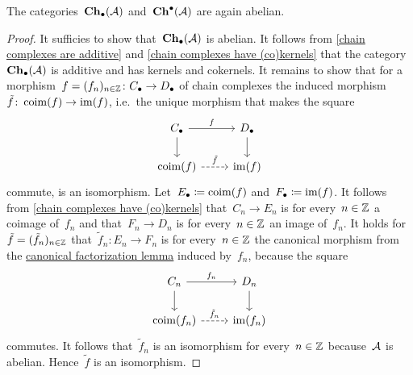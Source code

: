 

\begin{theorem}
  The categories~$\mathbf{Ch}_\bullet(\mathcal{A})$ and~$\mathbf{Ch}^\bullet(\mathcal{A})$ are again abelian.
\end{theorem}


\begin{proof}
  It sufficies to show that~$\mathbf{Ch}_\bullet(\mathcal{A})$ is abelian.
  It follows from \cref{chain complexes are additive} and \cref{chain complexes have (co)kernels} that the category~$\mathbf{Ch}_\bullet(\mathcal{A})$ is additive and has kernels and cokernels.
  It remains to show that for a morphism~$f = (f_n)_{n \in \mathbb{Z}} \colon C_\bullet \to D_\bullet$ of chain complexes the induced morphism~$\tilde{f} \colon \operatorname{coim}(f) \to \operatorname{im}(f)$, i.e.\ the unique morphism that makes the square
  \[
    \begin{tikzcd}
        \Ccc
        \arrow{r}[above]{f}
        \arrow{d}
      & \Dcc
        \arrow{d}
      \\
        \coim(f)
        \arrow[dashed]{r}[above]{\tilde{f}}
      & \im(f)
    \end{tikzcd}
  \]
  commute, is an isomorphism.
  Let~$E_\bullet \coloneqq \operatorname{coim}(f)$ and~$F_\bullet \coloneqq \operatorname{im}(f)$.
  It follows from \cref{chain complexes have (co)kernels} that~$C_n \to E_n$ is for every~$n \in \mathbb{Z}$ a coimage of~$f_n$ and that~$F_n \to D_n$ is for every~$n \in \mathbb{Z}$ an image of~$f_n$.
  It holds for~$\tilde{f} = (\tilde{f}_n)_{n \in \mathbb{Z}}$ that~$\tilde{f}_n \colon E_n \to F_n$ is for every~$n \in \mathbb{Z}$ the canonical morphism from the \hyperref[canonical factorization]{canonical factorization lemma} induced by~$f_n$, because the square
  \[
    \begin{tikzcd}
        C_n
        \arrow{r}[above]{f_n}
        \arrow{d}
      & D_n
        \arrow{d}
      \\
        \coim(f_n)
        \arrow[dashed]{r}[above]{\tilde{f}_n}
      & \im(f_n)
    \end{tikzcd}
  \]
  commutes.
  It follows that~$\tilde{f}_n$ is an isomorphism for every~$n \in \mathbb{Z}$ because~$\mathcal{A}$ is abelian.
  Hence~$\tilde{f}$ is an isomorphism.
\end{proof}




